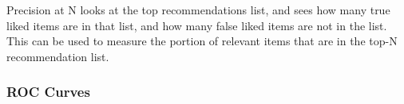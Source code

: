Precision at N looks at the top recommendations list, and sees how many true liked items are in that list, and how many false liked items are not in the list. This can be used to measure the portion of relevant items that are in the top-N recommendation list.





\subsubsection{ROC Curves}

